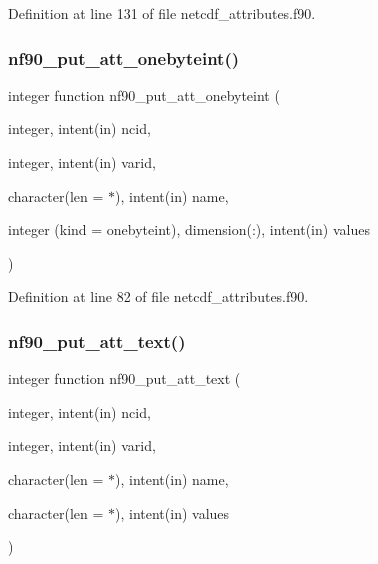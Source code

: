 Definition at line 131 of file netcdf\+\_\+attributes.\+f90.

\mbox{\label{netcdf__attributes_8f90_a18791f910f99beacee5782fb4f6d4337}} 
\subsubsection{\texorpdfstring{nf90\+\_\+put\+\_\+att\+\_\+onebyteint()}{nf90\_put\_att\_onebyteint()}}
{\footnotesize\ttfamily integer function nf90\+\_\+put\+\_\+att\+\_\+onebyteint (\begin{DoxyParamCaption}\item[{integer, intent(in)}]{ncid,  }\item[{integer, intent(in)}]{varid,  }\item[{character(len = $\ast$), intent(in)}]{name,  }\item[{integer (kind = onebyteint), dimension(\+:), intent(in)}]{values }\end{DoxyParamCaption})}



Definition at line 82 of file netcdf\+\_\+attributes.\+f90.

\mbox{\label{netcdf__attributes_8f90_ae6c36726624981e3569535e3871f1c8b}} 
\subsubsection{\texorpdfstring{nf90\+\_\+put\+\_\+att\+\_\+text()}{nf90\_put\_att\_text()}}
{\footnotesize\ttfamily integer function nf90\+\_\+put\+\_\+att\+\_\+text (\begin{DoxyParamCaption}\item[{integer, intent(in)}]{ncid,  }\item[{integer, intent(in)}]{varid,  }\item[{character(len = $\ast$), intent(in)}]{name,  }\item[{character(len = $\ast$), intent(in)}]{values }\end{DoxyParamCaption})}



